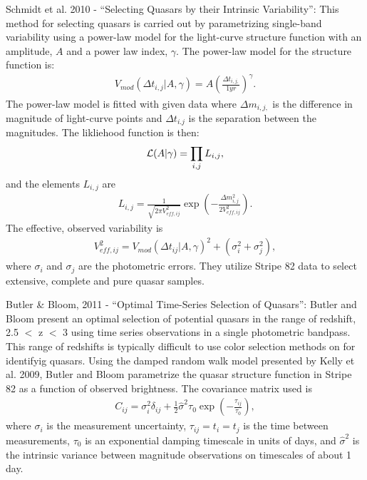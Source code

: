 \documentclass[letterpaper,12pt,preprint]{aastex}
\begin{document}
Schmidt et al. 2010 - ``Selecting Quasars by their Intrinsic
Variability'': This method for selecting quasars is carried out by
parametrizing single-band variability using a power-law model for the
light-curve structure function with an amplitude, $A$ and a power law
index, $\gamma$. The power-law model for the structure function is:
\begin{eqnarray}
V_{mod}(\Delta t_{i,j}|A,\gamma)=A\left(\frac{\Delta t_{i,j,}}{1
  yr}\right)^{\gamma}.
\end {eqnarray}
The power-law model is fitted with given data where $\Delta m_{i,j,}$
is the difference in magnitude of light-curve points and $\Delta
t_{i.j}$ is the separation between the magnitudes. The likliehood
function is then:
\begin{eqnarray}
{\cal L}(A|\gamma)= \prod_{i,j} L_{i,j},
\end{eqnarray}
and the elements $L_{i,j}$ are
\begin{eqnarray}
L_{i,j}=\frac{1}{\sqrt{2\pi V_{eff,ij}^2}}\exp\left(-\frac{\Delta
  m_{i,j}^2}{2V_{eff,ij}^2} \right).
\end{eqnarray}
The effective, observed variability is
\begin{eqnarray}
V_{eff,ij}^2=V_{mod}(\Delta t_{ij}|A,\gamma)^2+ (\sigma_i^2 +
\sigma_j^2),
\end{eqnarray} 
where $\sigma_i$ and $\sigma_j$ are the photometric errors. They
utilize Stripe 82 data to select extensive, complete and pure quasar
samples.

Butler \& Bloom, 2011 - ``Optimal Time-Series Selection of Quasars'':
Butler and Bloom present an optimal selection of potential quasars in
the range of redshift, 2.5 $<$ z $<$ 3 using time series observations
in a single photometric bandpass. This range of redshifts is typically
difficult to use color selection methods on for identifyig
quasars. Using the damped random walk model presented by Kelly et
al. 2009, Butler and Bloom parametrize the quasar structure function
in Stripe 82 as a function of observed brightness. The covariance
matrix used is
\begin{eqnarray}
C_{ij}=\sigma_i^2 \delta_{ij} + \frac{1}{2}\hat{\sigma}^2 \tau_0 \exp
\left(-\frac{\tau_{ij}}{\tau_0}\right),
\end{eqnarray}
where $\sigma_i$ is the measurement uncertainty, $\tau_{ij}=t_i=t_j$
is the time between measurements, $\tau_0$ is an exponential damping
timescale in units of days, and $\hat{\sigma}^2$ is the intrinsic
variance between magnitude observations on timescales of about 1 day.
\end{document}

